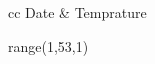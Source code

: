 \documentclass[12pt]{article}
\begin{document}
\begin{supertabular}{cc}
\hline
Date & Temprature \\
\hline
\begin{lbdpour}{range(1,53,1)}
\hline
{}
\hline
\end{lbdpour}
\end{supertabular}
\end{document}
